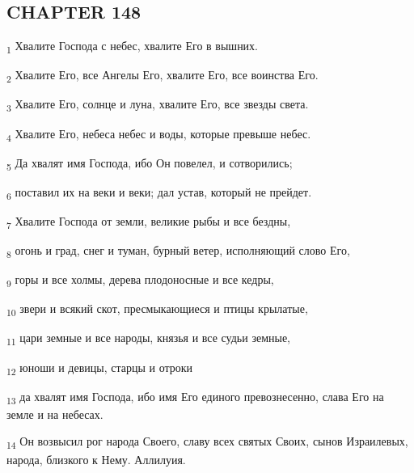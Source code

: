 \subsection{CHAPTER 148}
\begin{tcolorbox}
\textsubscript{1} Хвалите Господа с небес, хвалите Его в вышних.
\end{tcolorbox}
\begin{tcolorbox}
\textsubscript{2} Хвалите Его, все Ангелы Его, хвалите Его, все воинства Его.
\end{tcolorbox}
\begin{tcolorbox}
\textsubscript{3} Хвалите Его, солнце и луна, хвалите Его, все звезды света.
\end{tcolorbox}
\begin{tcolorbox}
\textsubscript{4} Хвалите Его, небеса небес и воды, которые превыше небес.
\end{tcolorbox}
\begin{tcolorbox}
\textsubscript{5} Да хвалят имя Господа, ибо Он повелел, и сотворились;
\end{tcolorbox}
\begin{tcolorbox}
\textsubscript{6} поставил их на веки и веки; дал устав, который не прейдет.
\end{tcolorbox}
\begin{tcolorbox}
\textsubscript{7} Хвалите Господа от земли, великие рыбы и все бездны,
\end{tcolorbox}
\begin{tcolorbox}
\textsubscript{8} огонь и град, снег и туман, бурный ветер, исполняющий слово Его,
\end{tcolorbox}
\begin{tcolorbox}
\textsubscript{9} горы и все холмы, дерева плодоносные и все кедры,
\end{tcolorbox}
\begin{tcolorbox}
\textsubscript{10} звери и всякий скот, пресмыкающиеся и птицы крылатые,
\end{tcolorbox}
\begin{tcolorbox}
\textsubscript{11} цари земные и все народы, князья и все судьи земные,
\end{tcolorbox}
\begin{tcolorbox}
\textsubscript{12} юноши и девицы, старцы и отроки
\end{tcolorbox}
\begin{tcolorbox}
\textsubscript{13} да хвалят имя Господа, ибо имя Его единого превознесенно, слава Его на земле и на небесах.
\end{tcolorbox}
\begin{tcolorbox}
\textsubscript{14} Он возвысил рог народа Своего, славу всех святых Своих, сынов Израилевых, народа, близкого к Нему. Аллилуия.
\end{tcolorbox}
